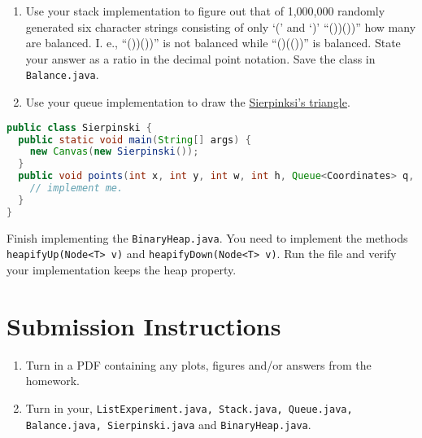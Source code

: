\documentclass{homework}
\begin{document}
\begin{enumerate}
  \item Use your stack implementation to figure out that of 1,000,000
        randomly generated six character strings consisting of only `('
        and `)' \eg ``())())'' how many are balanced. I. e., ``())())'' is
        not balanced while ``()(())'' is balanced. State your answer as a
        ratio in the decimal point notation. Save the class in
        \texttt{Balance.java}.
  \item Use your queue implementation to draw the
        \href{https://en.wikipedia.org/wiki/Sierpi%C5%84ski_triangle}{Sierpinksi's triangle}.
\end{enumerate}

\begin{lstlisting}[language=Java]
public class Sierpinski {
  public static void main(String[] args) {
    new Canvas(new Sierpinski());
  }
  public void points(int x, int y, int w, int h, Queue<Coordinates> q, int r) {
    // implement me.
  }
}
\end{lstlisting}

\question \sloppy Finish implementing the \texttt{BinaryHeap.java}. You need
to implement the methods \texttt{heapifyUp(Node<T> v)} and
\texttt{heapifyDown(Node<T> v)}. Run the file and verify your
implementation keeps the heap property.

\section*{Submission Instructions}

\begin{enumerate}
  \item Turn in a PDF containing any plots, figures and/or answers from
        the homework.
  \item Turn in your, \texttt{ListExperiment.java, Stack.java, Queue.java, Balance.java, Sierpinski.java} and \texttt{BinaryHeap.java}.
\end{enumerate}
\end{document}
